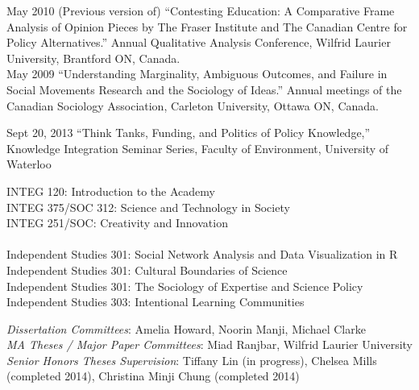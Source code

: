 \documentclass[11pt,usenames,dvipsnames]{article}
\begin{document}
\ind May 2010 (Previous version of) ``Contesting Education: A Comparative Frame Analysis of Opinion Pieces by The Fraser Institute and The Canadian Centre for Policy Alternatives.'' Annual Qualitative Analysis Conference, Wilfrid Laurier University, Brantford ON, Canada.\\

\ind May 2009 ``Understanding Marginality, Ambiguous Outcomes, and Failure in Social Movements Research and the Sociology of Ideas.'' Annual meetings of the Canadian Sociology Association, Carleton University, Ottawa ON, Canada.\\


\ind Sept 20, 2013 ``Think Tanks, Funding, and Politics of Policy Knowledge,'' Knowledge Integration Seminar Series, Faculty of Environment, University of Waterloo \\


\noindent INTEG 120: Introduction to the Academy \\
\noindent INTEG 375/SOC 312: Science and Technology in Society \\
\noindent INTEG 251/SOC: Creativity and Innovation \\ 
\\
\noindent Independent Studies 301: Social Network Analysis and Data Visualization in R \\ %
\noindent Independent Studies 301: Cultural Boundaries of Science \\ %
\noindent Independent Studies 301: The Sociology of Expertise and Science Policy \\ %
\noindent Independent Studies 303: Intentional Learning Communities \\ %

{}

\noindent \emph{Dissertation Committees}: Amelia Howard, Noorin Manji, Michael Clarke \\

\noindent \emph{MA Theses / Major Paper Committees}: Miad Ranjbar, Wilfrid Laurier University \\

\noindent \emph{Senior Honors Theses Supervision}: Tiffany Lin (in progress), Chelsea Mills (completed 2014), Christina Minji Chung (completed 2014) \\
\end{document}
